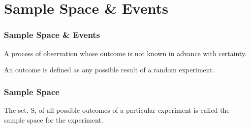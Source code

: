 \documentclass[compress]{beamer}
\begin{document}
\section{ Sample Space \& Events}







\begin{frame}
	\frametitle{ Sample Space \& Events}
	\begin{center}
	\begin{definition}
A process of observation whose outcome is not known in
advance with certainty.\\
\vspace{.1in}
\end{definition}
\vspace{-.2in}
\vspace{.5in}
\pause

\begin{definition}[Outcome]
An outcome is defined as any possible result of a random
experiment.\\
\vspace{.2in}
\end{definition}
\vspace{-.2in}
	\vspace{2in}
	\end{center}
\end{frame}





\begin{frame}
	\frametitle{ Sample Space}
		\begin{center}
	\begin{definition}
The set, S, of all possible outcomes of a particular experiment is called the sample space for the experiment. \\
\vspace{.2in}
\end{definition}
\vspace{-.2in}
\\
\vspace{.01in}
\pause
{}
\vspace{3in}

	\end{center}
\end{frame}
\end{document}

